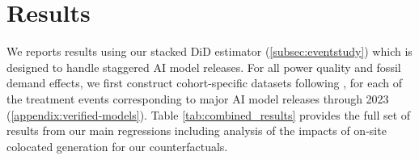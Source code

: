 \documentclass[sigconf,authordraft]{acmart}
\begin{document}



\section{Results}\label{Sec::Results}

We reports results using our stacked DiD estimator (\autoref{subsec:eventstudy}) which is designed to handle staggered AI model releases. For all power quality and fossil demand effects, we first construct cohort-specific datasets following \citet{callaway2021difference}, for each of the treatment events corresponding to major AI model releases through 2023 (\autoref{appendix:verified-models}).
Table \ref{tab:combined_results} provides the full set of results from our main regressions including analysis of the impacts of on-site colocated generation for our counterfactuals.
\end{document}

